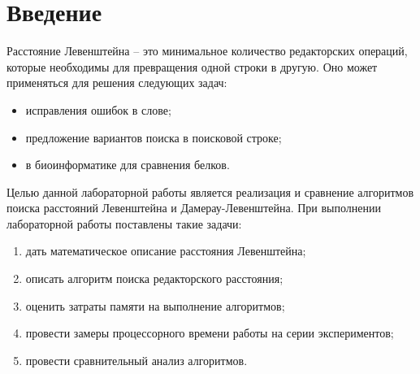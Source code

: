 \chapter*{Введение}
\label{cha:intro}
Расстояние Левенштейна -- это минимальное количество редакторских операций, которые необходимы для превращения одной строки в другую.
Оно может применяться для решения следующих задач:
\begin{itemize}
	\item исправления ошибок в слове;
	\item предложение вариантов поиска в поисковой строке;
	\item в биоинформатике для сравнения белков.
\end{itemize}
Целью данной лабораторной работы является реализация и сравнение алгоритмов поиска расстояний Левенштейна и Дамерау-Левенштейна.
При выполнении лабораторной работы поставлены такие задачи:
\begin{enumerate}[1)]
	\item дать математическое описание расстояния Левенштейна;
	\item описать алгоритм поиска редакторского расстояния;
	\item оценить затраты памяти на выполнение алгоритмов;
	\item провести замеры процессорного времени работы на серии экспериментов;
	\item провести сравнительный анализ алгоритмов.
\end{enumerate}
